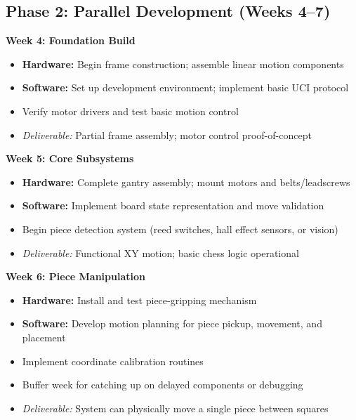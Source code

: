 \documentclass[11pt]{article}
\begin{document}
\vspace{0.5em}

\subsection*{\textcolor{phaseB}{Phase 2: Parallel Development (Weeks 4--7)}}

\noindent\textbf{Week 4: Foundation Build}
\begin{itemize}[noitemsep, leftmargin=2em]
    \item \textbf{Hardware:} Begin frame construction; assemble linear motion components
    \item \textbf{Software:} Set up development environment; implement basic UCI protocol
    \item Verify motor drivers and test basic motion control
    \item \textit{Deliverable:} Partial frame assembly; motor control proof-of-concept
\end{itemize}

\noindent\textbf{Week 5: Core Subsystems}
\begin{itemize}[noitemsep, leftmargin=2em]
    \item \textbf{Hardware:} Complete gantry assembly; mount motors and belts/leadscrews
    \item \textbf{Software:} Implement board state representation and move validation
    \item Begin piece detection system (reed switches, hall effect sensors, or vision)
    \item \textit{Deliverable:} Functional XY motion; basic chess logic operational
\end{itemize}

\noindent\textbf{Week 6: Piece Manipulation}
\begin{itemize}[noitemsep, leftmargin=2em]
    \item \textbf{Hardware:} Install and test piece-gripping mechanism
    \item \textbf{Software:} Develop motion planning for piece pickup, movement, and placement
    \item Implement coordinate calibration routines
    \item Buffer week for catching up on delayed components or debugging
    \item \textit{Deliverable:} System can physically move a single piece between squares
\end{itemize}
\end{document}
